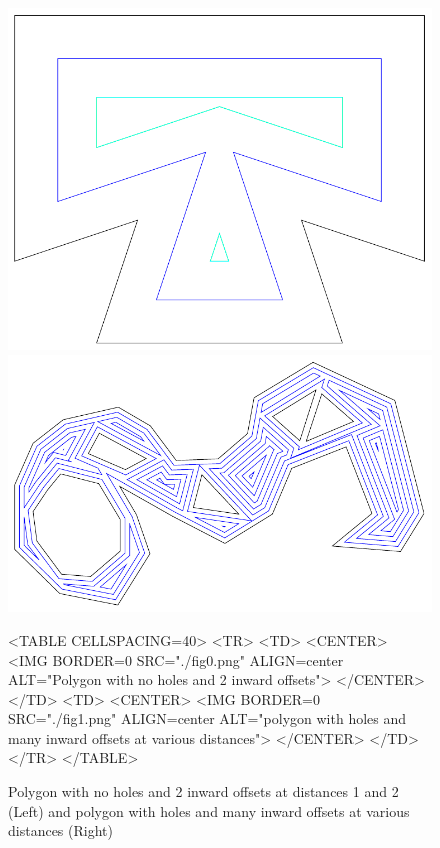 \begin{figure}[htbp]
\begin{ccTexOnly}
\begin{center}
\includegraphics{fig0} %
\includegraphics{fig1} %
\end{center}
\end{ccTexOnly}
\caption{Polygon with no holes and 2 inward offsets at distances 1 and 2 (Left) and polygon with holes and many inward offsets at various distances (Right)
\label{Simplepoly-offsets}}
\begin{ccHtmlOnly}
<TABLE CELLSPACING=40>
<TR>
<TD>
<CENTER>
<IMG BORDER=0 SRC="./fig0.png" ALIGN=center ALT="Polygon with no holes and 2 inward offsets">
</CENTER>
</TD>
<TD>
<CENTER>
<IMG BORDER=0 SRC="./fig1.png" ALIGN=center ALT="polygon with holes and many inward offsets at various distances">
</CENTER>
</TD>
</TR>
</TABLE>
\end{ccHtmlOnly}
\end{figure}

